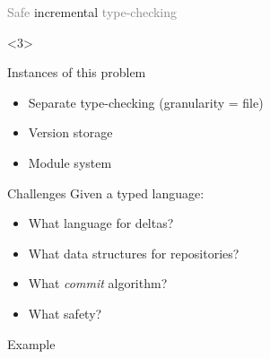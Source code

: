 \documentclass{beamer}
\begin{document}
\begin{frame}{\textcolor{gray}{Safe} incremental
    \textcolor{gray}{type-checking}}
  \begin{onlyenv}<3>
    \begin{block}{Instances of this problem}
      \begin{itemize}
      \item Separate type-checking (granularity = file)
      \item Version storage
      \item Module system
      \end{itemize}
    \end{block}
    \begin{block}{Challenges}
      Given a typed language:
      \begin{itemize}
      \item What language for deltas?
      \item What data structures for repositories?
      \item What \emph{commit} algorithm?
      \item What safety?
      \end{itemize}
    \end{block}
  \end{onlyenv}

\end{frame}

\begin{frame}{\textcolor{greenish}{Example}}
\end{frame}
\end{document}
